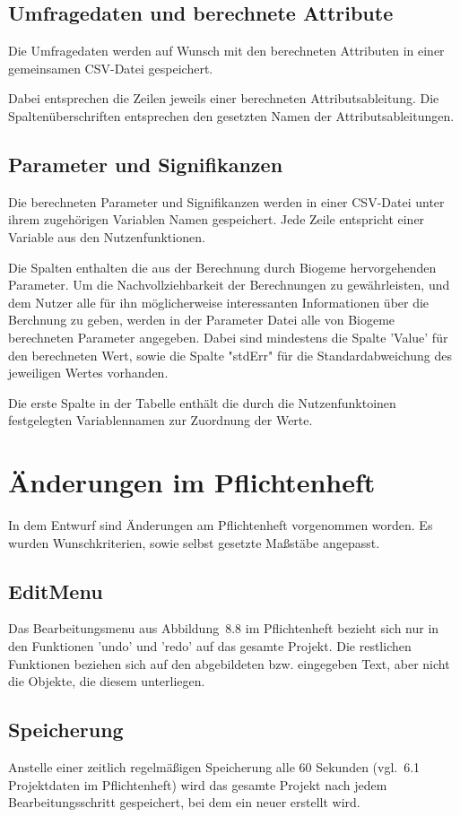 \documentclass{article}
\newcommand{\classref}[1]{\texttt{\nameref{cls:#1}}}
\begin{document}
\subsection{Umfragedaten und berechnete Attribute}
Die Umfragedaten werden auf Wunsch mit den berechneten Attributen in einer gemeinsamen CSV-Datei gespeichert. 

Dabei entsprechen die Zeilen jeweils einer berechneten Attributsableitung. Die Spaltenüberschriften entsprechen den gesetzten Namen der Attributsableitungen. 

\subsection{Parameter und Signifikanzen}
Die berechneten Parameter und Signifikanzen werden in einer CSV-Datei unter ihrem zugehörigen Variablen Namen gespeichert. Jede Zeile entspricht einer Variable aus den Nutzenfunktionen.

Die Spalten enthalten die aus der Berechnung durch Biogeme hervorgehenden Parameter. Um die Nachvollziehbarkeit der Berechnungen zu gewährleisten, und dem Nutzer alle für ihn  möglicherweise interessanten Informationen über die Berchnung zu geben, werden in der Parameter Datei alle von Biogeme berechneten Parameter angegeben. Dabei sind mindestens die Spalte 'Value' für den berechneten Wert, sowie die Spalte "stdErr" für die Standardabweichung des jeweiligen Wertes vorhanden.

Die erste Spalte in der Tabelle enthält die durch die Nutzenfunktoinen festgelegten Variablennamen zur Zuordnung der Werte.


\section{Änderungen im Pflichtenheft}
In dem Entwurf sind Änderungen am Pflichtenheft vorgenommen worden. Es wurden Wunschkriterien, sowie selbst gesetzte Maßstäbe angepasst.

\subsection{EditMenu}
Das Bearbeitungsmenu aus Abbildung~8.8 im Pflichtenheft bezieht sich nur in den Funktionen 'undo' und 'redo' auf das gesamte Projekt. Die restlichen Funktionen beziehen sich auf den abgebildeten bzw. eingegeben Text, aber nicht die Objekte, die diesem unterliegen.

\subsection{Speicherung}
Anstelle einer zeitlich regelmäßigen Speicherung alle 60 Sekunden (vgl.~6.1 Projektdaten im Pflichtenheft) wird das gesamte Projekt nach jedem Bearbeitungsschritt gespeichert, bei dem ein neuer \classref{ProjectSnapshot} erstellt wird.
\end{document}
